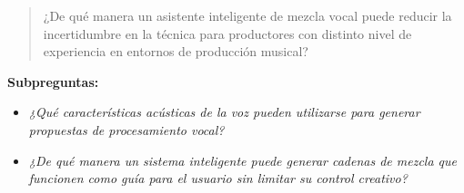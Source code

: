 \begin{quote}
¿De qué manera un asistente inteligente de mezcla vocal puede reducir la incertidumbre en la técnica para productores con distinto nivel de experiencia en entornos de producción musical?
\end{quote}

\textbf{Subpreguntas:}

\begin{itemize}
    \item \textit{¿Qué características acústicas de la voz pueden utilizarse para generar propuestas de procesamiento vocal?}
    \item \textit{¿De qué manera un sistema inteligente puede generar cadenas de mezcla que funcionen como guía para el usuario sin limitar su control creativo?}
\end{itemize}
